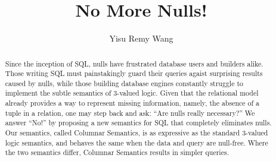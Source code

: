 \documentclass[sigconf]{acmart}
\begin{document}
\title{No More Nulls!}
\author{Yisu Remy Wang}

\begin{abstract}
Since the inception of SQL, 
 nulls have frustrated database users and builders alike.
Those writing SQL must painstakingly
 guard their queries agaist surprising results caused by nulls,
 while those building database engines
 constantly struggle to implement the subtle semantics of 3-valued logic.
Given that the relational model already provides a way 
 to represent missing information,
 namely, the absence of a tuple in a relation,
 one may step back and ask: ``Are nulls really necessary?''
We answer ``No!'' by proposing a new semantics for SQL
 that completely eliminates nulls.
Our semantics, called Columnar Semantics, 
 is as expressive as the standard 3-valued logic semantics,
 and behaves the same when the data and query are null-free.
Where the two semantics differ, Columnar Semantics results in simpler queries.
\end{abstract}

\maketitle
\end{document}
